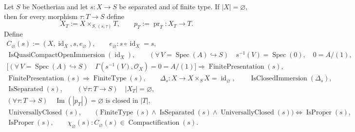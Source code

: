 \begin{definition}
  \label{def:nagata-noetherian-compactification}

  Let $S$ be Noetherian and let $s\colon X\to S$ be separated and of finite
  type.  If $|X|=\varnothing$, then for every morphism
  $\tau\colon T\to S$ define
  \[
    X_T:=X\times_{S,(s,\tau)}T,\qquad
    p_T:=\operatorname{pr}_T\colon X_T\to T.
  \]
  Define
  \[
  \begin{gathered}
    C_\varnothing(s):=
      (X,\operatorname{id}_X,s,e_\varnothing),\qquad
    e_\varnothing\colon s\circ\operatorname{id}_X=s,\\
    \operatorname{IsQuasiCompactOpenImmersion}(\operatorname{id}_X),
    \qquad
    (\forall\,V=\operatorname{Spec}(A)\hookrightarrow S)\quad
      s^{-1}(V)=\operatorname{Spec}(0),\quad
      0=A/(1),\\
    \bigl[(\forall\,V=\operatorname{Spec}(A)\hookrightarrow S)\quad
      \Gamma(s^{-1}(V),\mathcal O_X)=0=A/(1)\bigr]
      \Longrightarrow\operatorname{FinitePresentation}(s),\\
    \operatorname{FinitePresentation}(s)
      \Longrightarrow\operatorname{FiniteType}(s),\qquad
    \Delta_s\colon X\to X\times_SX
      =\operatorname{id}_{\varnothing},\qquad
    \operatorname{IsClosedImmersion}(\Delta_s),\\
    \operatorname{IsSeparated}(s),\qquad
    (\forall\tau\colon T\to S)\quad |X_T|=\varnothing,\\
    (\forall\tau\colon T\to S)\quad
      \operatorname{Im}(|p_T|)=\varnothing
      \text{ is closed in }|T|,\\
    \operatorname{UniversallyClosed}(s),\qquad
    \bigl(\operatorname{FiniteType}(s)\wedge
      \operatorname{IsSeparated}(s)\wedge
      \operatorname{UniversallyClosed}(s)\bigr)
      \Longleftrightarrow\operatorname{IsProper}(s),\\
    \operatorname{IsProper}(s),\qquad
    \chi_\varnothing(s)\colon
      C_\varnothing(s)\in\operatorname{Compactification}(s).
  \end{gathered}                                                    \tag{NC0}
  \]


\end{definition}
